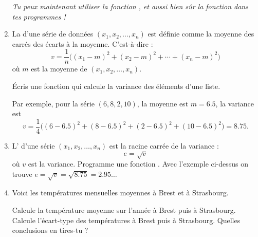 \documentclass[11pt,class=report,crop=false]{standalone}
\begin{document}
\begin{activite}
\begin{enumerate}
\begin{fonctionpython}
  \end{fonctionpython}   
  
  \emph{Tu peux maintenant utiliser la fonction , et aussi bien sûr la fonction  dans tes programmes !} 
  
  \item La  d'une série de données $(x_1,x_2,\ldots,x_n)$ est définie comme la moyenne des carrés des écarts à la moyenne. C'est-à-dire :
  $$v = \frac{1}{n}\big((x_1-m)^2 + (x_2-m)^2 + \cdots + (x_n-m)^2\big)$$
  où $m$ est la moyenne de $(x_1,x_2,\ldots,x_n)$.
  
  Écris une fonction  qui calcule la variance des éléments d'une liste.
  
  Par exemple, pour la série $(6,8,2,10)$, la moyenne est $m = 6.5$, la variance est
  $$v = \frac{1}{4} \big((6-6.5)^2 + (8-6.5)^2 + (2-6.5)^2 + (10-6.5)^2\big) = 8.75.$$
  
  \item L' d'une série $(x_1,x_2,\ldots,x_n)$ est la racine carrée de la variance :
  $$e = \sqrt{v}$$
  où $v$ est la variance. Programme une fonction .
  Avec l'exemple ci-dessus on trouve $e = \sqrt{v} = \sqrt{8.75} = 2.95\ldots$
  

  \item Voici les températures mensuelles moyennes à Brest et à Strasbourg.

{\small
	  
  \centerline{}
  
  \centerline{}

}

  Calcule la température moyenne sur l'année à Brest puis à Strasbourg. Calcule l'écart-type 
  des températures à Brest puis à Strasbourg. Quelles conclusions en tires-tu ? 

\end{enumerate}

\end{activite}
\end{document}

